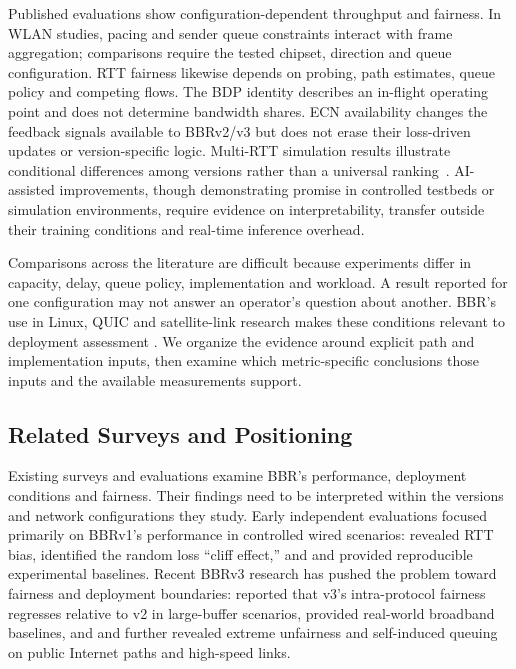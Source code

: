\documentclass[a4paper,fleqn]{cas-sc}
\begin{document}
Published evaluations show configuration-dependent throughput and fairness.
In WLAN studies, pacing and sender queue constraints interact with frame
aggregation; comparisons require the tested chipset, direction and queue
configuration. RTT fairness likewise depends on probing, path estimates,
queue policy and competing flows. The BDP identity describes an in-flight
operating point and does not determine bandwidth shares. ECN availability
changes the feedback signals available to BBRv2/v3 but does not erase their
loss-driven updates or version-specific logic. Multi-RTT simulation results
illustrate conditional differences among versions rather than a universal
ranking~\citep{rfc3168,rfc9330,rfc9331,rfc9332,piotrowska2024}. AI-assisted improvements, though demonstrating promise in controlled testbeds
or simulation environments, require evidence on interpretability, transfer outside their training
conditions and real-time inference overhead.

Comparisons across the literature are difficult because experiments differ
in capacity, delay, queue policy, implementation and workload. A result
reported for one configuration may not answer an operator's question about
another. BBR's use in Linux, QUIC and satellite-link research makes these
conditions relevant to deployment assessment
\citep{cardwell2017bbr,cardwell2019bbrv2,ietf_ccwg_bbr,abrol2026bbr,zeynali2024bbrv3}.
We organize the evidence around explicit path and implementation inputs,
then examine which metric-specific conclusions those inputs and the
available measurements support.

\subsection{Related Surveys and Positioning}
\label{sec:related}

Existing surveys and evaluations examine BBR's performance, deployment
conditions and fairness. Their findings need to be interpreted within the
versions and network configurations they study. Early independent evaluations
focused primarily on BBRv1's performance in controlled wired scenarios:
\citet{hock2017bbr} revealed RTT bias, \citet{cao2019bbr} identified the random
loss ``cliff effect,'' and \citet{jaeger2019bbr} and \citet{scholz2018deeper}
provided reproducible experimental baselines. Recent BBRv3 research has pushed
the problem toward fairness and deployment boundaries: \citet{piotrowska2024}
reported that v3's intra-protocol fairness regresses relative to v2 in
large-buffer scenarios, \citet{gomez2024bbrv3} provided real-world broadband
baselines, and \citet{zeynali2024bbrv3} and \citet{bless2025insights} further
revealed extreme unfairness and self-induced queuing on public Internet paths and
high-speed links.
\end{document}
